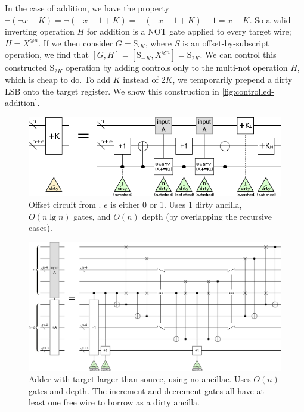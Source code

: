 \documentclass[twocolumn,longbibliography]{quantumarticle}
\begin{document}
In the case of addition, we have the property $\lnot (\lnot x + K) = \lnot (-x - 1 + K) = -(-x - 1 + K) - 1 = x-K$.
So a valid inverting operation $H$ for addition is a NOT gate applied to every target wire; $H=X^{\otimes n}$.
If we then consider $G=\text{S}_{\text{-} K}$, where $S$ is an offset-by-subscript operation, we find that $[G, H] = [\text{S}_{-K}, X^{\otimes n}] = \text{S}_{2K}$.
We can control this constructed $\text{S}_{2K}$ operation by adding controls only to the multi-not operation $H$, which is cheap to do.
To add $K$ instead of $2K$, we temporarily prepend a dirty LSB onto the target register.
We show this construction in \autoref{fig:controlled-addition}.

\begin{figure}
  \centering
  \includegraphics[width=\linewidth]{assets/offset.png}
  \caption{
      Offset circuit from \cite{haner2016}.
      $e$ is either 0 or 1.
      Uses $1$ dirty ancilla, $O(n \lg n)$ gates, and $O(n)$ depth (by overlapping the recursive cases).
  }
  \label{fig:offset}
\end{figure}

\begin{figure}
  \centering
  \includegraphics[width=\linewidth]{assets/inline-adder-into-large.png}
  \caption{
      Adder with target larger than source, using no ancillae.
      Uses $O(n)$ gates and depth.
      The increment and decrement gates all have at least one free wire to borrow as a dirty ancilla.
  }
  \label{fig:inline-adder-into-large}
\end{figure}
\end{document}
